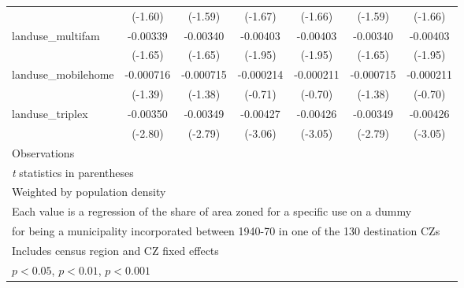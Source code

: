 \begin{table}[htbp]
\begin{tabular}{l*{6}{c}}
                    &     (-1.60)         &     (-1.59)         &     (-1.67)         &     (-1.66)         &     (-1.59)         &     (-1.66)         \\
\addlinespace
landuse\_multifam    &    -0.00339         &    -0.00340         &    -0.00403         &    -0.00403         &    -0.00340         &    -0.00403         \\
                    &     (-1.65)         &     (-1.65)         &     (-1.95)         &     (-1.95)         &     (-1.65)         &     (-1.95)         \\
\addlinespace
landuse\_mobilehome  &   -0.000716         &   -0.000715         &   -0.000214         &   -0.000211         &   -0.000715         &   -0.000211         \\
                    &     (-1.39)         &     (-1.38)         &     (-0.71)         &     (-0.70)         &     (-1.38)         &     (-0.70)         \\
\addlinespace
landuse\_triplex     &    -0.00350\sym{**} &    -0.00349\sym{**} &    -0.00427\sym{**} &    -0.00426\sym{**} &    -0.00349\sym{**} &    -0.00426\sym{**} \\
                    &     (-2.80)         &     (-2.79)         &     (-3.06)         &     (-3.05)         &     (-2.79)         &     (-3.05)         \\
\midrule
Observations        &                     &                     &                     &                     &                     &                     \\
\bottomrule
\multicolumn{7}{l}{\footnotesize \textit{t} statistics in parentheses}\\
\multicolumn{7}{l}{\footnotesize Weighted by population density}\\
\multicolumn{7}{l}{\footnotesize Each value is a regression of the share of area zoned for a specific use on a dummy}\\
\multicolumn{7}{l}{\footnotesize for being a municipality incorporated between 1940-70 in one of the 130 destination CZs}\\
\multicolumn{7}{l}{\footnotesize Includes census region and CZ fixed effects}\\
\multicolumn{7}{l}{\footnotesize \sym{*} \(p<0.05\), \sym{**} \(p<0.01\), \sym{***} \(p<0.001\)}\\
\end{tabular}
\end{table}
